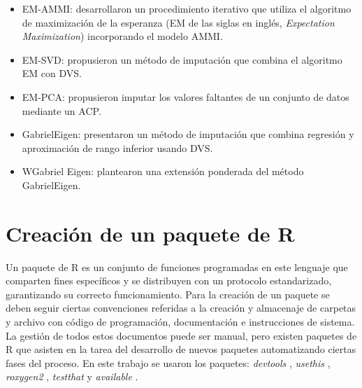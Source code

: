 \begin{itemize}
\item EM-AMMI: \citet{GauchZobel1990} desarrollaron un procedimiento iterativo que utiliza el algoritmo de maximización de la esperanza (EM de las siglas en inglés, \emph{Expectation Maximization}) incorporando el modelo AMMI. 
\end{itemize}
\begin{itemize}
\item EM-SVD: \citet{Troyanskayaetal2001} propusieron un método de imputación que combina el algoritmo EM con DVS. 
\end{itemize}
\begin{itemize}
\item EM-PCA: \citet{JosseHusson2016} propusieron imputar los valores faltantes de un conjunto de datos mediante un ACP.
\end{itemize}
\begin{itemize}
\item GabrielEigen: \citet{Alarconetal2010} presentaron un método de imputación que combina regresión y aproximación de rango inferior usando DVS. 
\end{itemize}
\begin{itemize}
\item WGabriel Eigen: \citet{Alarconetal2014} plantearon una extensión ponderada del método GabrielEigen.
\end{itemize}


\section{Creación de un paquete de R}


Un paquete de R es un conjunto de funciones programadas en este lenguaje que comparten fines específicos y se distribuyen con un protocolo estandarizado, garantizando su correcto funcionamiento. Para la creación de un paquete se deben seguir ciertas convenciones referidas a la creación y almacenaje de carpetas y archivo con código de programación, documentación e instrucciones de sistema. La gestión de todos estos documentos puede ser manual, pero existen paquetes de R que asisten en la tarea del desarrollo de nuevos paquetes automatizando ciertas fases del proceso. En este trabajo se usaron los paquetes: \emph{devtools} \citep{Wickhametal2021}, \emph{usethis} \citep{WickhamBryan2021}, \emph{roxygen2} \citep{Wickhametal2020}, \emph{testthat} \citep{Wickham2011} y \emph{available} \citep{Ganzetal2019}. 

